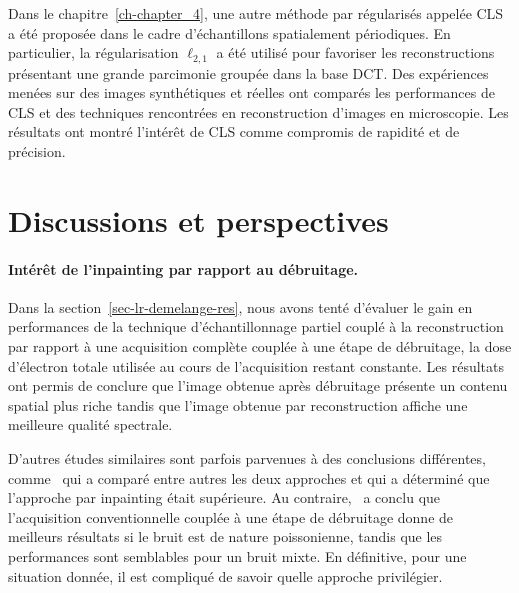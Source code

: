 Dans le chapitre~\ref{ch-chapter_4}, une autre méthode par  régularisés appelée CLS a été proposée dans le cadre d'échantillons spatialement périodiques. En particulier, la régularisation $\ell_{2,1}$ a été utilisé pour favoriser les reconstructions présentant une grande parcimonie groupée dans la base DCT. Des expériences menées sur des images synthétiques et réelles ont comparés les performances de CLS et des techniques rencontrées en reconstruction d'images en microscopie. Les résultats ont montré l'intérêt de CLS comme compromis de rapidité et de précision.


\section*{Discussions et perspectives}

\paragraph{Intérêt de l'inpainting par rapport au débruitage.} Dans la section~\ref{sec-lr-demelange-res}, nous avons tenté d'évaluer le gain en performances de la technique d'échantillonnage partiel couplé à la reconstruction par rapport à une acquisition complète couplée à une étape de débruitage, la dose d'électron totale utilisée au cours de l'acquisition restant constante. Les résultats ont permis de conclure que l'image obtenue après débruitage présente un contenu spatial plus riche tandis que l'image obtenue par reconstruction affiche une meilleure qualité spectrale.

D'autres études similaires sont parfois parvenues à des conclusions différentes, comme~\cite{trampert2018ultramicroscopy} qui a comparé entre autres les deux approches et qui a déterminé que l'approche par inpainting était supérieure. Au contraire,~\cite{sanders2020inpainting} a conclu que l'acquisition conventionnelle couplée à une étape de débruitage donne de meilleurs résultats si le bruit est de nature poissonienne, tandis que les performances sont semblables pour un bruit mixte. En définitive, pour une situation donnée, il est compliqué de savoir quelle approche privilégier.

